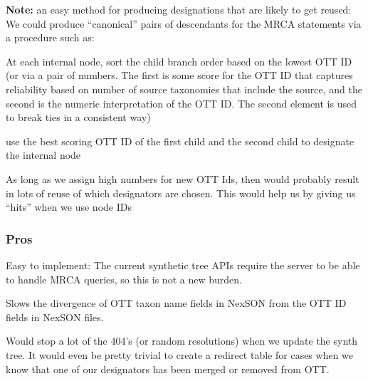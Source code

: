 \documentclass[11pt]{article}
\begin{document}
{\bf Note:} an easy method for producing designations that are likely to get reused:
We could produce ``canonical'' pairs of descendants for the MRCA statements
  via a procedure such as:
\begin{compactenum}
  \item At each internal node, sort the child branch order based on the lowest OTT ID (or via a pair of numbers. The first is some score 
  for the OTT ID that captures reliability based on number of source taxonomies
  that include the source, and the second is the numeric interpretation of the OTT ID.
  The second element is used to break ties in a consistent way) 
  \item use the best scoring OTT ID of the first child and the second child to designate the internal node
\end{compactenum}
As long as we assign high numbers for new OTT Ids, then would probably result in
  lots of reuse of which designators are chosen.
This would help us by giving us ``hits'' when we use node IDs

\subsubsection{Pros}
\begin{compactenum}
  \item Easy to implement:
  The current synthetic tree APIs require the server to be able to handle MRCA
    queries, so this is not a new burden.
  \item Slows the divergence of OTT taxon name fields in NexSON from the OTT ID fields in NexSON files.
  \item Would stop a lot of the 404's (or random resolutions) when we update the
  synth tree. It would even be pretty trivial to create a redirect table for cases
  when we know that one of our designators has been merged or removed from OTT.
\end{compactenum}
\end{document}
